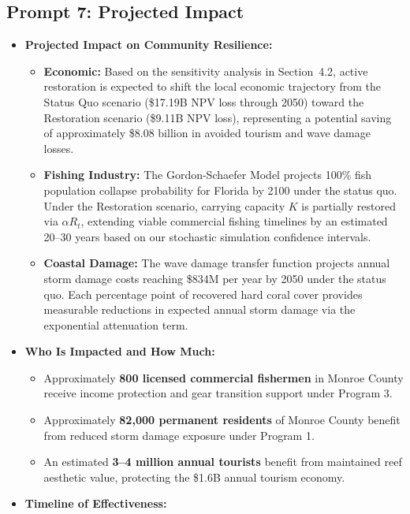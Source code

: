\documentclass[10pt,letterpaper]{article}
\begin{document}
\subsection*{Prompt 7: Projected Impact}
\begin{itemize}
    \item \textbf{Projected Impact on Community Resilience:}
    \begin{itemize}
        \item \textbf{Economic:} Based on the sensitivity analysis in Section~4.2, active restoration is expected to shift the local economic trajectory from the Status Quo scenario (\$17.19B NPV loss through 2050) toward the Restoration scenario (\$9.11B NPV loss), representing a potential saving of approximately \$8.08 billion in avoided tourism and wave damage losses.
        \item \textbf{Fishing Industry:} The Gordon-Schaefer Model projects 100\% fish population collapse probability for Florida by 2100 under the status quo. Under the Restoration scenario, carrying capacity $K$ is partially restored via $\alpha R_t$, extending viable commercial fishing timelines by an estimated 20--30 years based on our stochastic simulation confidence intervals.
        \item \textbf{Coastal Damage:} The wave damage transfer function projects annual storm damage costs reaching \$834M per year by 2050 under the status quo. Each percentage point of recovered hard coral cover provides measurable reductions in expected annual storm damage via the exponential attenuation term.
    \end{itemize}
    \item \textbf{Who Is Impacted and How Much:}
    \begin{itemize}
        \item Approximately \textbf{800 licensed commercial fishermen} in Monroe County receive income protection and gear transition support under Program 3.
        \item Approximately \textbf{82,000 permanent residents} of Monroe County benefit from reduced storm damage exposure under Program 1.
        \item An estimated \textbf{3--4 million annual tourists} benefit from maintained reef aesthetic value, protecting the \$1.6B annual tourism economy.
    \end{itemize}
    \item \textbf{Timeline of Effectiveness:}
    \begin{itemize}

\end{itemize}
\end{itemize}
\end{document}
